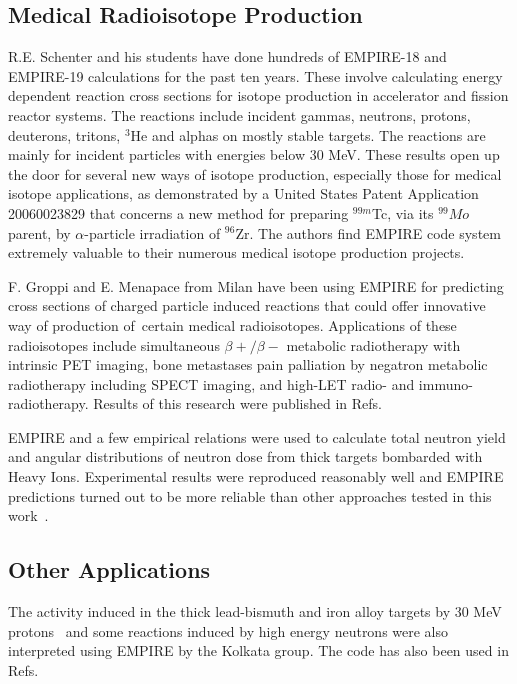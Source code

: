 \documentclass[twocolumn,amsmath,amssymb,10pt,groupedaddress,letter]{revtex4}
\begin{document}
\subsection{Medical Radioisotope Production}
R.E. Schenter and his students have done hundreds of EMPIRE-18 and EMPIRE-19 calculations for the past ten years.  These involve calculating energy dependent reaction cross sections for isotope production in accelerator and fission reactor systems.   The reactions include incident gammas, neutrons, protons, deuterons, tritons, $^3$He and alphas on mostly stable targets. The reactions are mainly for incident particles with energies below 30 MeV.  These results open up the door for several new ways of isotope production, especially those for medical isotope applications, as demonstrated by a United States Patent Application 20060023829 that concerns a new method for preparing $^{99m}$Tc, via its $^{99}Mo$ parent, by $\alpha$-particle irradiation of $^{96}$Zr. The authors find EMPIRE code system extremely valuable to their numerous medical isotope  production projects.

F. Groppi and E. Menapace from Milan have been using EMPIRE for predicting cross sections of charged particle induced reactions that could offer innovative way of production of certain medical radioisotopes. Applications of these radioisotopes include simultaneous $\beta+/\beta-$ metabolic radiotherapy with intrinsic PET imaging,  bone metastases pain palliation by negatron metabolic radiotherapy including SPECT imaging,  and high-LET radio- and immuno-radiotherapy. Results of this research were published in Refs.~\cite{Menapace:04, Menapace:05, Groppi:05, Groppi:05a, Groppi:06, Alfassi:06, Persico:06}

EMPIRE and a few empirical relations were used to calculate total neutron yield and angular distributions of neutron dose from thick targets bombarded with Heavy Ions. Experimental results were reproduced reasonably well and EMPIRE predictions turned out to be more reliable than other approaches tested in this work~\cite{Nandy:07}.


\subsection{Other Applications}
The  activity induced in the thick lead-bismuth and iron alloy targets by 30 MeV protons~\cite{Nandy:07a} and some reactions induced by high energy neutrons were also interpreted using EMPIRE by the Kolkata group. The code  has also been used in Refs.~\cite{Said:06, Elmaghraby:06, Pandey:07}
\end{document}

